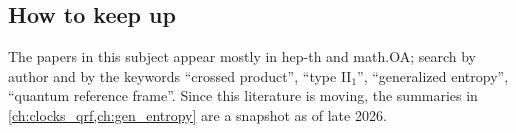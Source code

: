 \subsection{How to keep up}
The papers in this subject appear mostly in hep-th and math.OA; search by author and by the keywords ``crossed product'', ``type II$_1$'', ``generalized entropy'', ``quantum reference frame''. Since this literature is moving, the summaries in \cref{ch:clocks_qrf,ch:gen_entropy} are a snapshot as of late 2026.

